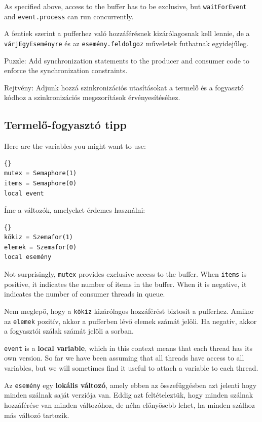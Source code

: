 \documentclass{book}
\newcommand{\clearemptydoublepage}{\newpage\cleardoublepage}
\begin{document}
As specified above, access to the buffer has to be exclusive,
but {\tt waitForEvent} and {\tt event.process}
can run concurrently.

A fentiek szerint a pufferhez való hozzáférésnek kizárólagosnak
kell lennie, de a {\tt várjEgyEseményre} és az {\tt esemény.feldolgoz}
műveletek futhatnak egyidejűleg.

Puzzle: Add synchronization statements to the producer and
consumer code to enforce the synchronization constraints.


Rejtvény: Adjunk hozzá szinkronizációs utasításokat a termelő
és a fogyasztó kódhoz a szinkronizációs megszorítások érvényesítéséhez.



\clearemptydoublepage
\subsection{Termelő-fogyasztó tipp}

Here are the variables you might want to use:

\begin{lstlisting}[title={Producer-consumer initialization}]{}
mutex = Semaphore(1)
items = Semaphore(0)
local event
\end{lstlisting}

Íme a változók, amelyeket érdemes használni:

\begin{lstlisting}[title={Termelő-fogyasztó inicializáció}]{}
kökiz = Szemafor(1)
elemek = Szemafor(0)
local esemény
\end{lstlisting}

Not surprisingly, {\tt mutex} provides exclusive access to
the buffer.  When {\tt items} is positive, it indicates the
number of items in the buffer.  When it is negative, it
indicates the number of consumer threads in queue.

Nem meglepő, hogy a {\tt kökiz} kizárólagos hozzáférést biztosít a pufferhez.
Amikor az {\tt elemek} pozitív, akkor a pufferben lévő elemek számát jelöli.
Ha negatív, akkor a fogyasztói szálak számát jelöli a sorban.

{\tt event} is a {\bf local variable}, which in this context means
that each thread has its own version.
So far we have been assuming that all threads have access
to all variables, but we will sometimes find it useful to
attach a variable to each thread.

Az {\tt esemény} egy {\bf lokális változó}, amely ebben az összefüggésben azt jelenti
hogy minden szálnak saját verziója van. Eddig azt feltételeztük, hogy minden szálnak
hozzáférése van minden változóhoz, de néha előnyösebb lehet, ha minden szálhoz más változó tartozik.
\end{document}
